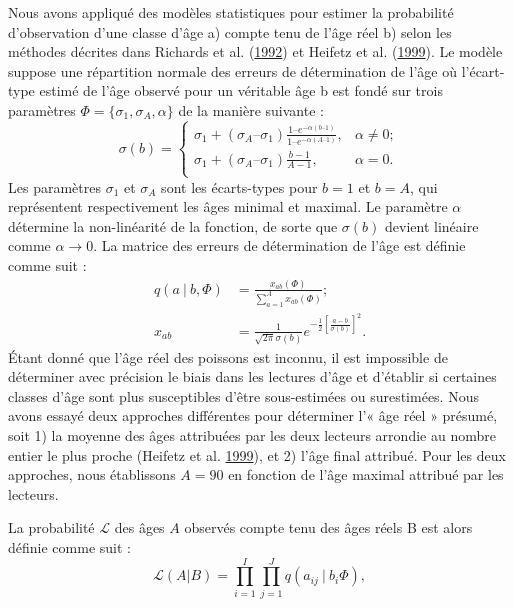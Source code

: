 \documentclass[11pt]{book}
\begin{document}
Nous avons appliqué des modèles statistiques pour estimer la probabilité d'observation d'une classe d'âge a) compte tenu de l'âge réel b) selon les méthodes décrites dans Richards et al. (\protect\hyperlink{ref-richards1992statistical}{1992}) et Heifetz et al. (\protect\hyperlink{ref-heifetz1999age}{1999}). Le modèle suppose une répartition normale des erreurs de détermination de l'âge où l'écart-type estimé de l'âge observé pour un véritable âge b est fondé sur trois paramètres \(\Phi = \{ \sigma_1, \sigma_A, \alpha \}\) de la manière suivante :
\begin{equation}
\sigma(b) = \left\{
 \begin{array}{ll}
  \sigma_1 + (\sigma_A – \sigma_1) \frac{1 – e^{-\alpha(b – 1)} }{1 – e^{-\alpha(A – 1)}}, & \alpha \neq 0; \\
  \sigma_1 + (\sigma_A – \sigma_1) \frac{b-1}{A-1}, & \alpha = 0.\\
 \end{array} \right.
\end{equation}
Les paramètres \(\sigma_1\) et \(\sigma_A\) sont les écarts-types pour \(b=1\) et \(b=A\), qui représentent respectivement les âges minimal et maximal. Le paramètre \(\alpha\) détermine la non-linéarité de la fonction, de sorte que \(\sigma(b)\) devient linéaire comme \(\alpha \rightarrow 0\). La matrice des erreurs de détermination de l'âge est définie comme suit :
\begin{align}
q(a ~|~ b, \Phi) &= \frac{x_{ab}(\Phi)}{\sum_{a = 1}^A x_{ab}(\Phi) }; \\x_{ab} &= \frac{1}{\sqrt{2\pi}\sigma(b)} e^{-\frac12 \left[ \frac{a-b}{\sigma(b)} \right]^2}.
\end{align}
Étant donné que l'âge réel des poissons est inconnu, il est impossible de déterminer avec précision le biais dans les lectures d'âge et d'établir si certaines classes d'âge sont plus susceptibles d'être sous-estimées ou surestimées. Nous avons essayé deux approches différentes pour déterminer l'« âge réel » présumé, soit 1) la moyenne des âges attribuées par les deux lecteurs arrondie au nombre entier le plus proche (Heifetz et al. \protect\hyperlink{ref-heifetz1999age}{1999}), et 2) l'âge final attribué. Pour les deux approches, nous établissons \(A=90\) en fonction de l'âge maximal attribué par les lecteurs.

La probabilité \(\mathcal{L}\) des âges \(A\) observés compte tenu des âges réels B est alors définie comme suit :
\begin{equation}
\mathcal{L}(A|B) = \prod_{i = 1}^I \prod_{j = 1}^J q(a_{ij} ~|~ b_i \Phi),\end{equation}
\end{document}

